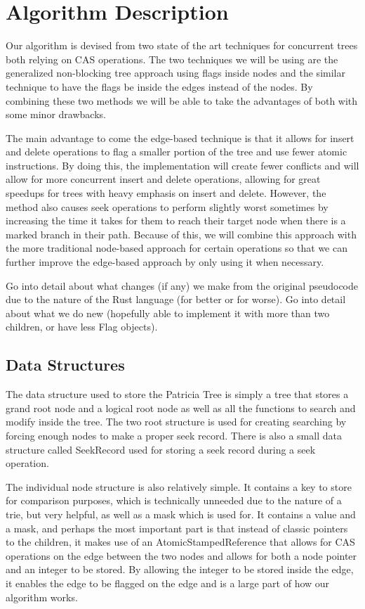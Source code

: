 \documentclass[conference]{IEEEtran}
\begin{document}
\section{Algorithm Description}
Our algorithm is devised from two state of the art techniques for concurrent trees both relying on CAS operations. The two techniques we will be using are the generalized non-blocking tree approach using flags inside nodes \cite{Shafiei2013,Brown2014} and the similar technique to have the flags be inside the edges instead of the nodes. \cite{Natarajan2014} By combining these two methods we will be able to take the advantages of both with some minor drawbacks.
\par
The main advantage to come the edge-based technique is that it allows for insert and delete operations to flag a smaller portion of the tree and use fewer atomic instructions. \cite{Natarajan2014} By doing this, the implementation will create fewer conflicts and will allow for more concurrent insert and delete operations, allowing for great speedups for trees with heavy emphasis on insert and delete. However, the method also causes seek operations to perform slightly worst sometimes by increasing the time it takes for them to reach their target node when there is a marked branch in their path. Because of this, we will combine this approach with the more traditional node-based approach for certain operations so that we can further improve the edge-based approach by only using it when necessary. 

Go into detail about what changes (if any) we make from the original pseudocode due to the nature of the Rust language (for better or for worse). Go into detail about what we do new (hopefully able to implement it with more than two children, or have less Flag objects).


\subsection{Data Structures}
The data structure used to store the Patricia Tree is simply a tree that stores a grand root node and a logical root node as well as all the functions to search and modify inside the tree. The two root structure is used for creating searching by forcing enough nodes to make a proper seek record. There is also a small data structure called SeekRecord used for storing a seek record during a seek operation.
\par
The individual node structure is also relatively simple. It contains a key to store for comparison purposes, which is technically unneeded due to the nature of a trie, but very helpful, as well as a mask which is used for. It contains a value and a mask, and perhaps the most important part is that instead of classic pointers to the children, it makes use of an AtomicStampedReference that allows for CAS operations on the edge between the two nodes and allows for both a node pointer and an integer to be stored. By allowing the integer to be stored inside the edge, it enables the edge to be flagged on the edge and is a large part of how our algorithm works.
\end{document}
